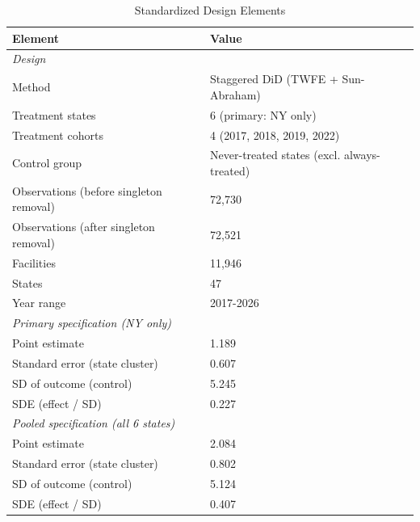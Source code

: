 \begin{table}[htbp]
\centering
\caption{Standardized Design Elements}
\label{tab:sde}
\begin{tabular}{ll}
\toprule
Element & Value \\
\midrule
\multicolumn{2}{l}{\textit{Design}} \\
Method & Staggered DiD (TWFE + Sun-Abraham) \\
Treatment states & 6 (primary: NY only) \\
Treatment cohorts & 4 (2017, 2018, 2019, 2022) \\
Control group & Never-treated states (excl. always-treated) \\
Observations (before singleton removal) & 72,730 \\
Observations (after singleton removal) & 72,521 \\
Facilities & 11,946 \\
States & 47 \\
Year range & 2017-2026 \\[0.3em]
\multicolumn{2}{l}{\textit{Primary specification (NY only)}} \\
Point estimate & 1.189 \\
Standard error (state cluster) & 0.607 \\
SD of outcome (control) & 5.245 \\
SDE (effect / SD) & 0.227 \\[0.3em]
\multicolumn{2}{l}{\textit{Pooled specification (all 6 states)}} \\
Point estimate & 2.084 \\
Standard error (state cluster) & 0.802 \\
SD of outcome (control) & 5.124 \\
SDE (effect / SD) & 0.407 \\
\bottomrule
\end{tabular}
\end{table}
